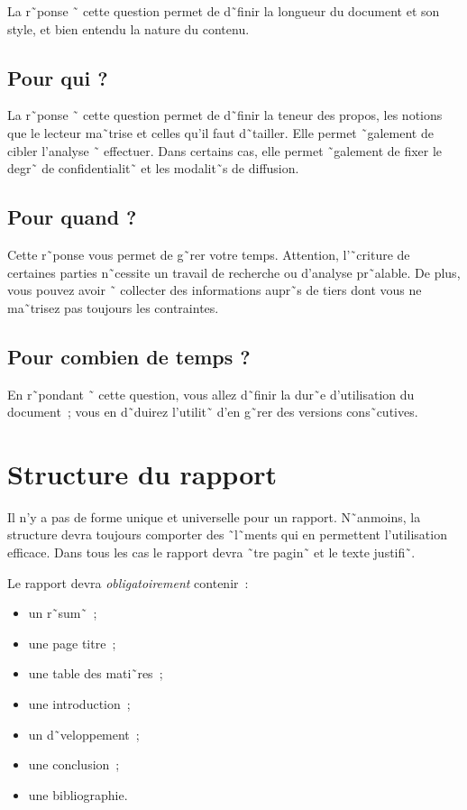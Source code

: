 La r˜ponse ˜ cette question permet de d˜finir la longueur du
document et son style, et bien entendu la nature du contenu.

\subsection*{Pour qui ?}

La r˜ponse ˜ cette question permet de d˜finir la teneur des propos, les
notions que le lecteur ma˜trise et celles qu'il faut d˜tailler. Elle permet
˜galement de cibler l'analyse ˜ effectuer. Dans certains cas, elle permet
˜galement de fixer le degr˜ de confidentialit˜ et
les modalit˜s de diffusion.

\subsection*{Pour quand ?}

Cette r˜ponse vous permet de g˜rer votre temps. Attention, l'˜criture de
certaines parties n˜cessite un travail de recherche ou d'analyse pr˜alable. De
plus, vous 
pouvez avoir ˜ collecter des informations aupr˜s de tiers dont vous ne
ma˜trisez pas toujours les contraintes.

\subsection*{Pour combien de temps ?}

En r˜pondant ˜ cette question, vous allez d˜finir la dur˜e
d'utilisation du document~; vous en d˜duirez l'utilit˜ d'en g˜rer des versions
cons˜cutives.


\section{Structure du rapport}
\label{sec:struct}

Il n'y a pas de forme unique et universelle pour un rapport.
N˜anmoins, la structure devra toujours comporter des ˜l˜ments qui en
permettent l'utilisation efficace.
Dans tous les cas le rapport devra ˜tre pagin˜ et le texte justifi˜.

 Le rapport devra \emph{obligatoirement} contenir~:
 \begin{itemize}
 \item un r˜sum˜~; 
 \item une page titre~;
 \item une table des mati˜res~;
 \item une introduction~;
 \item un d˜veloppement~; 
 \item une conclusion~;
\item une bibliographie.
 \end{itemize}

